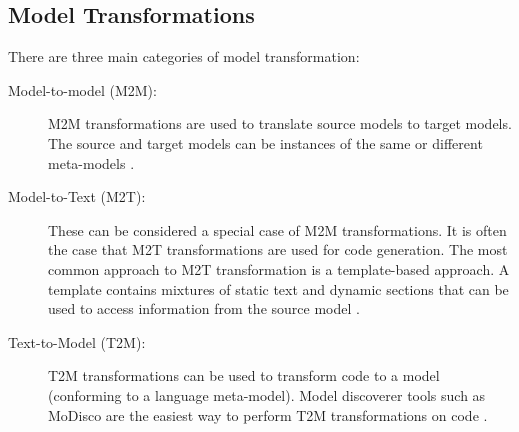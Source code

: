 \documentclass{UoYCSproject}
\begin{document}

\subsection{Model Transformations}
There are three main categories of model transformation:
\begin{description}
\item[Model-to-model (M2M):] M2M transformations are used to translate source models to target models. The source and target models can be instances of the same or different meta-models \parencite{czarnecki2003classification}.
\item[Model-to-Text (M2T):] These can be considered a special case of M2M transformations. It is often the case that M2T transformations are used for code generation. The most common approach to M2T transformation is a template-based approach. A template contains mixtures of static text and dynamic sections that can be used to access information from the source model \parencite{czarnecki2003classification}.
\item[Text-to-Model (T2M):]  T2M transformations can be used to transform code to a model (conforming to a language meta-model). Model discoverer tools such as MoDisco \parencite{bruneliere2014modisco} are the easiest way to perform T2M transformations on code \parencite{kowalczyk2009model}.
\end{description}
\end{document}
